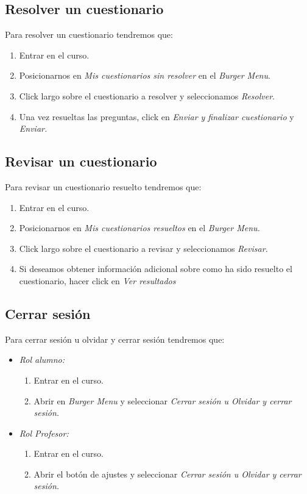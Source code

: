 \subsection{Resolver un cuestionario}

Para resolver un cuestionario tendremos que:
\begin{enumerate}
	\item Entrar en el curso.
	\item Posicionarnos en \emph{Mis cuestionarios sin resolver} en el \emph{Burger Menu}.
	\item Click largo sobre el cuestionario a resolver y seleccionamos \emph{Resolver}.
	\item Una vez resueltas las preguntas, click en \emph{Enviar y finalizar cuestionario} y \emph{Enviar.}
\end{enumerate}



\subsection{Revisar un cuestionario}

Para revisar un cuestionario resuelto tendremos que:
\begin{enumerate}
	\item Entrar en el curso.
	\item Posicionarnos en \emph{Mis cuestionarios resueltos} en el \emph{Burger Menu.}
	\item Click largo sobre el cuestionario a revisar y seleccionamos \emph{Revisar.}
	\item Si deseamos obtener información adicional sobre como ha sido resuelto el cuestionario, hacer click en \emph{Ver resultados}
\end{enumerate}


\subsection{Cerrar sesión}

Para cerrar sesión u olvidar y cerrar sesión tendremos que:

\begin{itemize}
	\item \emph{Rol alumno:}
	\begin{enumerate}
		\item Entrar en el curso.
		\item Abrir en \emph{Burger Menu} y seleccionar \emph{Cerrar sesión u Olvidar y cerrar sesión.}
	\end{enumerate}
	\item \emph{Rol Profesor:}
		\begin{enumerate}
			\item Entrar en el curso.
			\item Abrir el botón de ajustes y seleccionar \emph{Cerrar sesión u Olvidar y cerrar sesión.}
		\end{enumerate}
\end{itemize}


